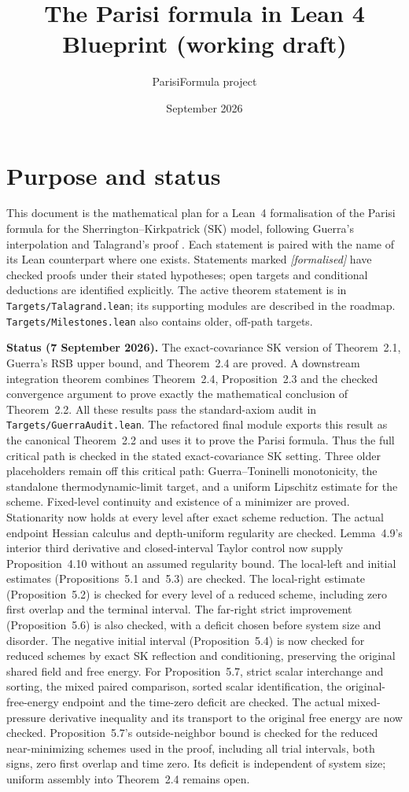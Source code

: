 \documentclass[11pt]{article}
\title{The Parisi formula in Lean 4\\ \large Blueprint (working draft)}
\author{ParisiFormula project}
\date{September 2026}
\begin{document}
\maketitle

\section*{Purpose and status}

This document is the mathematical plan for a Lean~4 formalisation of the Parisi
formula for the Sherrington--Kirkpatrick (SK) model, following Guerra's interpolation
and Talagrand's proof \cite{Tal06}.  Each statement is paired with the name of its
Lean counterpart where one exists. Statements marked \emph{[formalised]} have checked
proofs under their stated hypotheses; open targets and conditional deductions are
identified explicitly. The active theorem statement is in
\texttt{Targets/Talagrand.lean}; its supporting modules are described in the roadmap.
\texttt{Targets/Milestones.lean} also contains older, off-path targets.

\textbf{Status (7 September 2026).} The exact-covariance SK version of Theorem~2.1,
Guerra's RSB upper bound, and Theorem~2.4 are proved. A downstream integration
theorem combines Theorem~2.4, Proposition~2.3 and the checked convergence argument
to prove exactly the mathematical conclusion of Theorem~2.2. All these results
pass the standard-axiom audit in \texttt{Targets/GuerraAudit.lean}. The refactored
final module exports this result as the canonical Theorem~2.2 and uses it to prove
the Parisi formula. Thus the full critical path is checked in the stated
exact-covariance SK setting.
Three older placeholders remain off this critical path: Guerra--Toninelli
monotonicity, the standalone thermodynamic-limit target, and a uniform Lipschitz
estimate for the scheme. Fixed-level continuity and existence of a minimizer are proved.
Stationarity now holds at every level after exact scheme reduction. The actual
endpoint Hessian calculus and depth-uniform regularity are checked. Lemma~4.9's
interior third derivative and closed-interval Taylor control now supply
Proposition~4.10 without an assumed regularity bound. The local-left and initial
estimates (Propositions~5.1 and~5.3) are checked. The local-right estimate
(Proposition~5.2) is checked for every level of a reduced scheme, including
zero first overlap and the terminal interval. The far-right strict improvement
(Proposition~5.6) is also checked, with a deficit chosen before system size
and disorder. The negative initial interval (Proposition~5.4) is now checked
for reduced schemes by exact SK reflection and conditioning, preserving the
original shared field and free energy. For Proposition~5.7, strict scalar
interchange and sorting, the mixed paired comparison, sorted scalar
identification, the original-free-energy endpoint and the time-zero deficit
are checked. The actual mixed-pressure derivative inequality and its transport
to the original free energy are now checked. Proposition~5.7's outside-neighbor
bound is checked for the reduced near-minimizing schemes used in the proof,
including all trial intervals, both signs, zero first overlap and time zero.
Its deficit is independent of system size; uniform assembly into
Theorem~2.4 remains open.
\end{document}
